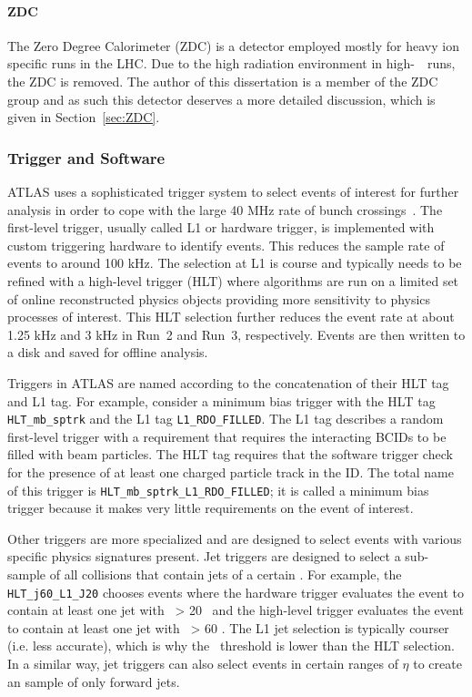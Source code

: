\paragraph{ZDC} The Zero Degree Calorimeter (ZDC) is a detector employed mostly for heavy ion specific runs in the LHC.
Due to the high radiation environment in high-\avmu\ \pxp\ runs, the ZDC is removed.
The author of this dissertation is a member of the ZDC group and as such this detector deserves a more detailed discussion, which is given in Section~\ref{sec:ZDC}.

\FloatBarrier
\subsubsection{Trigger and Software}
\label{sec:ATLASTrig}
ATLAS uses a sophisticated trigger system to select events of interest for further analysis in order to cope with the large 40 MHz rate of bunch crossings~\cite{TRIG-2016-01,TRIG-2022-01}.
The first-level trigger, usually called L1 or hardware trigger, is implemented with custom triggering hardware to identify events.
This reduces the sample rate of events to around 100 kHz.
The selection at L1 is course and typically needs to be refined with a high-level trigger (HLT) where algorithms are run on a limited set of online reconstructed physics objects providing more sensitivity to physics processes of interest.
This HLT selection further reduces the event rate at about 1.25 kHz and 3 kHz in Run~2 and Run~3, respectively.
Events are then written to a disk and saved for offline analysis.

Triggers in ATLAS are named according to the concatenation of their HLT tag and L1 tag.
For example, consider a minimum bias trigger with the HLT tag \texttt{HLT\_mb\_sptrk} and the L1 tag \texttt{L1\_RDO\_FILLED}.
The L1 tag describes a random first-level trigger with a requirement that requires the interacting BCIDs to be filled with beam particles.
The HLT tag requires that the software trigger check for the presence of at least one charged particle track in the ID.
The total name of this trigger is \texttt{HLT\_mb\_sptrk\_L1\_RDO\_FILLED}; it is called a minimum bias trigger because it makes very little requirements on the event of interest.

Other triggers are more specialized and are designed to select events with various specific physics signatures present.
Jet triggers are designed to select a sub-sample of all collisions that contain jets of a certain \PT.
For example, the \texttt{HLT\_j60\_L1\_J20} chooses events where the hardware trigger evaluates the event to contain at least one jet with \PT\ > 20 \GeV\ and the high-level trigger evaluates the event to contain at least one jet with \PT\ > 60 \GeV.
The L1 jet selection is typically courser (i.e. less accurate), which is why the \PT\ threshold is lower than the HLT selection.
In a similar way, jet triggers can also select events in certain ranges of $\eta$ to create an sample of only forward jets.

